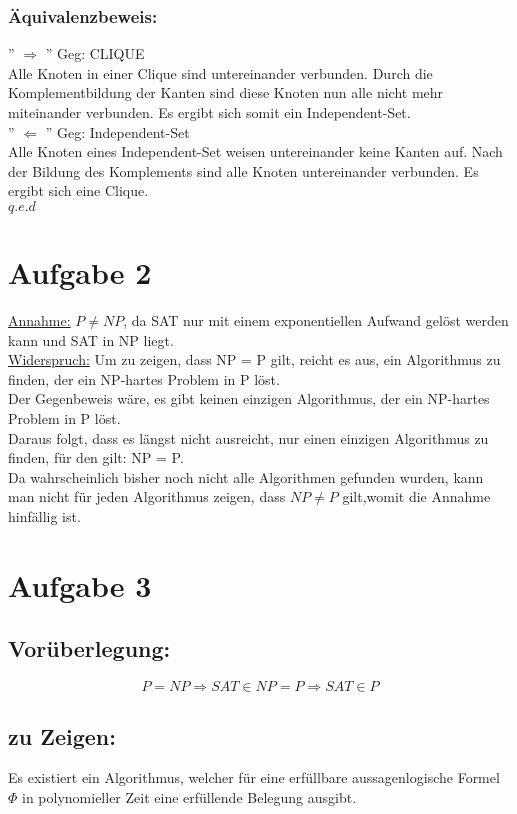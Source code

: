 \documentclass[a4paper,11pt,twoside]{article}
\begin{document}
 \subsubsection*{Äquivalenzbeweis:} 
'' $\Rightarrow$ ''
Geg: CLIQUE\\
Alle Knoten in einer Clique sind untereinander verbunden. Durch die Komplementbildung der Kanten sind diese Knoten nun alle nicht mehr miteinander verbunden. Es ergibt sich somit ein Independent-Set. \\

'' $\Leftarrow$ ''
Geg: Independent-Set\\
Alle Knoten eines Independent-Set weisen untereinander keine Kanten auf. Nach der Bildung des Komplements sind alle Knoten untereinander verbunden. Es ergibt sich eine Clique. \\

$q.e.d$


\section*{Aufgabe 2}
\underline{Annahme:}  $P \neq NP$, da SAT nur mit einem exponentiellen Aufwand gelöst werden kann und SAT in NP liegt.\\
\underline {Widerspruch:} Um zu zeigen, dass NP = P gilt, reicht es aus, ein Algorithmus zu finden, der ein NP-hartes Problem in P löst.\\
Der Gegenbeweis wäre, es gibt keinen einzigen Algorithmus, der ein NP-hartes Problem in P löst. \\
Daraus folgt, dass es längst nicht ausreicht, nur einen einzigen Algorithmus zu finden, für den gilt: NP = P.\\
Da wahrscheinlich bisher noch nicht alle Algorithmen gefunden wurden, kann man nicht für jeden Algorithmus zeigen, dass $NP \neq P$ gilt,womit  die Annahme hinfällig ist.



\section*{Aufgabe 3}
\subsection*{Vorüberlegung:}
\[P=NP \Rightarrow SAT\in NP=P\Rightarrow SAT\in P\]
\subsection*{zu Zeigen:}
Es existiert ein Algorithmus, welcher für eine erfüllbare aussagenlogische Formel $\Phi$ in polynomieller Zeit eine erfüllende Belegung ausgibt.\\
\end{document}
